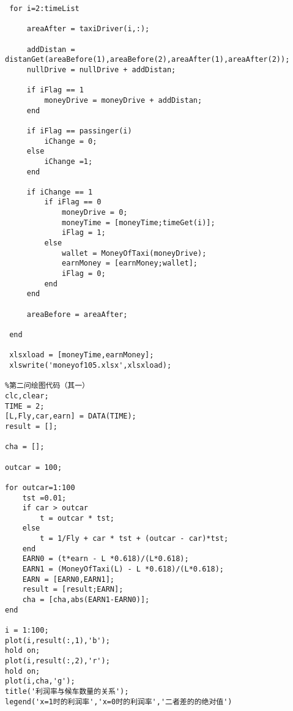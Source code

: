 \documentclass[withoutpreface,bwprint]{cumcmthesis} %
\begin{document}
\begin{lstlisting}
 for i=2:timeList
     
     areaAfter = taxiDriver(i,:);
     
     addDistan = distanGet(areaBefore(1),areaBefore(2),areaAfter(1),areaAfter(2));
     nullDrive = nullDrive + addDistan;
     
     if iFlag == 1
         moneyDrive = moneyDrive + addDistan;
     end

     if iFlag == passinger(i)
         iChange = 0;
     else 
         iChange =1;
     end
     
     if iChange == 1
         if iFlag == 0
             moneyDrive = 0;
             moneyTime = [moneyTime;timeGet(i)];
             iFlag = 1;
         else
             wallet = MoneyOfTaxi(moneyDrive);
             earnMoney = [earnMoney;wallet];
             iFlag = 0;
         end
     end
     
     areaBefore = areaAfter;
     
 end
 
 xlsxload = [moneyTime,earnMoney];
 xlswrite('moneyof105.xlsx',xlsxload);

%第二问绘图代码（其一）
clc,clear;
TIME = 2;
[L,Fly,car,earn] = DATA(TIME);
result = [];

cha = [];

outcar = 100;

for outcar=1:100    
    tst =0.01;
    if car > outcar
        t = outcar * tst;
    else
        t = 1/Fly + car * tst + (outcar - car)*tst;
    end
    EARN0 = (t*earn - L *0.618)/(L*0.618);
    EARN1 = (MoneyOfTaxi(L) - L *0.618)/(L*0.618);
    EARN = [EARN0,EARN1];
    result = [result;EARN];
    cha = [cha,abs(EARN1-EARN0)];
end

i = 1:100;
plot(i,result(:,1),'b');
hold on;
plot(i,result(:,2),'r');
hold on;
plot(i,cha,'g');
title('利润率与候车数量的关系'); 
legend('x=1时的利润率','x=0时的利润率','二者差的的绝对值') 

\end{lstlisting}
\end{document}
